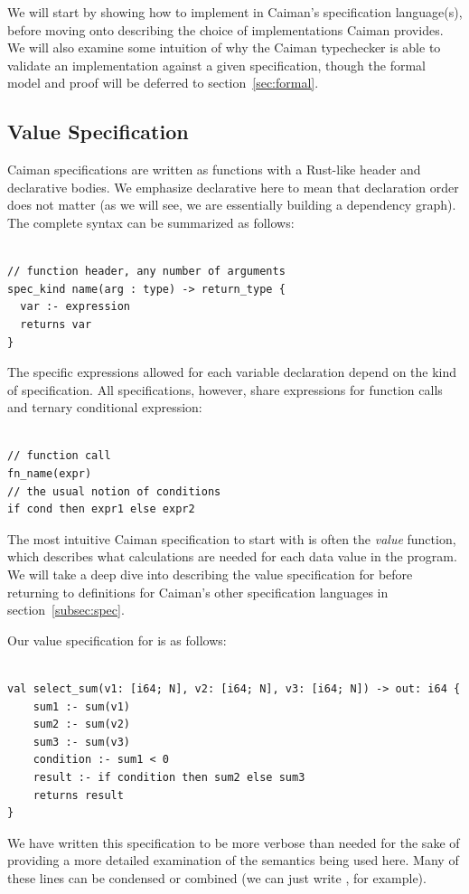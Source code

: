 We will start by showing how to implement  in Caiman's specification language(s), before moving onto describing the choice of implementations Caiman provides.  We will also examine some intuition of why the Caiman typechecker is able to validate an implementation against a given specification, though the formal model and proof will be deferred to section~\ref{sec:formal}.

\subsection{Value Specification}
\label{subsec:value}

Caiman specifications are written as functions with a Rust-like header and declarative bodies.  We emphasize declarative here to mean that declaration order does not matter (as we will see, we are essentially building a dependency graph).  The complete syntax can be summarized as follows:
%
\begin{lstlisting}

// function header, any number of arguments
spec_kind name(arg : type) -> return_type {
  var :- expression
  returns var
}
\end{lstlisting}
%
The specific expressions allowed for each variable declaration depend on the kind of specification.  All specifications, however, share expressions for function calls and ternary conditional expression:
%
\begin{lstlisting}

// function call
fn_name(expr)
// the usual notion of conditions
if cond then expr1 else expr2
\end{lstlisting}
%
The most intuitive Caiman specification to start with is often the \textit{value} function, which describes what calculations are needed for each data value in the program.  We will take a deep dive into describing the value specification for  before returning to definitions for Caiman's other specification languages in section~\ref{subsec:spec}.  

Our value specification for  is as follows:
%
\begin{lstlisting}

val select_sum(v1: [i64; N], v2: [i64; N], v3: [i64; N]) -> out: i64 {
    sum1 :- sum(v1)
    sum2 :- sum(v2)
    sum3 :- sum(v3)
    condition :- sum1 < 0
    result :- if condition then sum2 else sum3
    returns result
}
\end{lstlisting}
%
We have written this specification to be more verbose than needed for the sake of providing a more detailed examination of the semantics being used here.  Many of these lines can be condensed or combined (we can just write , for example).

